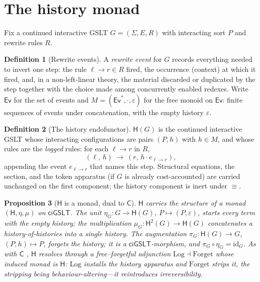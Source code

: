 \documentclass[11pt]{article}
\theoremstyle{definition}
\newtheorem{definition}{Definition}[section]
\theoremstyle{plain}
\newtheorem{proposition}[definition]{Proposition}
\theoremstyle{remark}
\newcommand{\Ev}{\mathsf{Ev}}
\newcommand{\cost}{\mathsf{C}}
\newcommand{\hist}{\mathsf{H}}
\newcommand{\ciGSLT}{\mathsf{ciGSLT}}
\newcommand{\id}{\mathrm{id}}
\newcommand{\emptyhist}{\varepsilon}
\begin{document}
\section{The history monad}
\label{sec:monad}

Fix a continued interactive GSLT $G=(\Sigma,E,R)$ with interacting sort $P$ and rewrite rules $R$.

\begin{definition}[Rewrite events]\label{def:event}
A \emph{rewrite event} for $G$ records everything needed to invert one step: the rule
$\ell\to r\in R$ fired, the occurrence (context) at which it fired, and, in a non-left-linear
theory, the material discarded or duplicated by the step together with the choice made among
concurrently enabled redexes. Write $\Ev$ for the set of events and
$M=(\Ev^{*},\cdot,\emptyhist)$ for the free monoid on $\Ev$: finite sequences of events under
concatenation, with the empty history $\emptyhist$.
\end{definition}

\begin{definition}[The history endofunctor]\label{def:hist}
$\hist(G)$ is the continued interactive GSLT whose interacting configurations are pairs $(P,h)$ with
$h\in M$, and whose rules are the \emph{logged} rules: for each $\ell\to r$ in $R$,
\[
  (\ell,\,h)\ \longrightarrow\ (r,\,h\cdot e_{\ell\to r}),
\]
appending the event $e_{\ell\to r}$ that names this step. Structural equations, the section, and
the token apparatus (if $G$ is already cost-accounted) are carried unchanged on the first
component; the history component is inert under $\equiv$.
\end{definition}

\begin{proposition}[$\hist$ is a monad, dual to $\cost$]\label{prop:monad}
$\hist$ carries the structure of a monad $(\hist,\eta,\mu)$ on $\ciGSLT$. The unit
$\eta_G:G\to\hist(G)$, $P\mapsto(P,\emptyhist)$, starts every term with the empty history; the
multiplication $\mu_G:\hist^2(G)\to\hist(G)$ concatenates a history-of-histories into a single
history. The augmentation $\pi_G:\hist(G)\to G$, $(P,h)\mapsto P$, forgets the history; it is a
$\ciGSLT$-morphism, and $\pi_G\circ\eta_G=\id_G$. As with $\cost$ \cite[\S9]{CE}, $\hist$ resolves
through a free--forgetful adjunction $\mathrm{Log}\dashv\mathrm{Forget}$ whose induced monad is
$\hist$: $\mathrm{Log}$ installs the history apparatus and $\mathrm{Forget}$ strips it, the
stripping being behaviour-altering---it reintroduces irreversibility.
\end{proposition}
\end{document}
